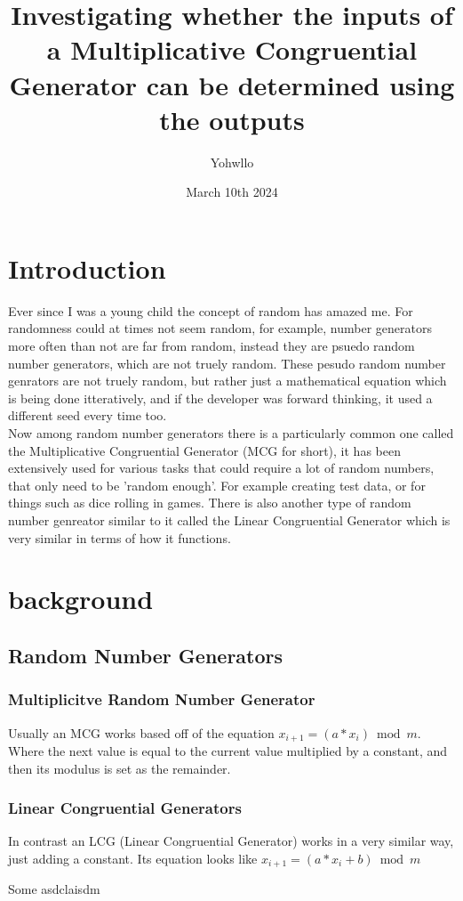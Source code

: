 \documentclass[12pft, english]{article}
\title{Investigating whether the inputs of a Multiplicative Congruential Generator can be determined using the outputs}
\author{Yohwllo}
\date{March 10th 2024}
\begin{document}
\maketitle

\tableofcontents
\pagebreak

\begin{multicols}{2}
  \section{Introduction}
  Ever since I was a young child the concept of random has amazed me. For randomness could at times not seem random, for example, number generators more often than not are far from random, instead they are psuedo random number generators, which are not truely random. These pesudo random number genrators are not truely random, but rather just a mathematical equation which is being done itteratively, and if the developer was forward thinking, it used a different seed every time too. \\
  Now among random number generators there is a particularly common one called the Multiplicative Congruential Generator (MCG for short), it has been extensively used for various tasks that could require a lot of random numbers, that only need to be 'random enough'. For example creating test data, or for things such as dice rolling in games. There is also another type of random number genreator similar to it called the Linear Congruential Generator which is very similar in terms of how it functions.

  \section{background}
  \subsection{Random Number Generators}
  \subsubsection{Multiplicitve Random Number Generator}
  Usually an MCG works based off of the equation \(x_{i+1} = (a*x_{i}) \bmod m\). Where the next value is equal to the current value multiplied by a constant, and then its modulus is set as the remainder. \citep{waterlooMCG}
  \subsubsection{Linear Congruential Generators}
  In contrast an LCG (Linear Congruential Generator) works in a very similar way, just adding a constant. Its equation looks like \(x_{i+1} = (a*x_{i} +b ) \bmod m\) \citep{waterlooMCG}


  \columnbreak

\end{multicols}

Some asdclaisdm \citep{example}

\citet{waterlooMCG}

\citet{whack}



\end{document}
